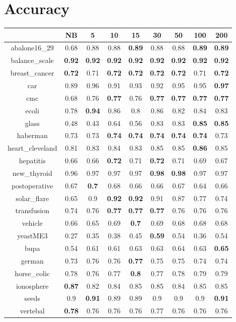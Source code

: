 \documentclass{article}%
\begin{document}
%
\normalsize%
\section*{Accuracy}%
\begin{tabular}{c|cccccccc}%
\hline%
&NB&5&10&15&30&50&100&200\\%
\hline%
abalone16\_29&0.68&0.88&0.88&\textbf{0.89}&0.88&0.88&\textbf{0.89}&\textbf{0.89}\\%
\hline%
balance\_scale&\textbf{0.92}&\textbf{0.92}&\textbf{0.92}&\textbf{0.92}&\textbf{0.92}&\textbf{0.92}&\textbf{0.92}&\textbf{0.92}\\%
\hline%
breast\_cancer&\textbf{0.72}&0.71&\textbf{0.72}&\textbf{0.72}&\textbf{0.72}&\textbf{0.72}&0.71&\textbf{0.72}\\%
\hline%
car&0.89&0.96&0.91&0.93&0.92&0.95&0.95&\textbf{0.97}\\%
\hline%
cmc&0.68&0.76&\textbf{0.77}&0.76&\textbf{0.77}&\textbf{0.77}&\textbf{0.77}&\textbf{0.77}\\%
\hline%
ecoli&0.78&\textbf{0.94}&0.86&0.8&0.86&0.82&0.84&0.83\\%
\hline%
glass&0.48&0.43&0.64&0.56&0.83&0.83&\textbf{0.85}&\textbf{0.85}\\%
\hline%
haberman&0.73&0.73&\textbf{0.74}&\textbf{0.74}&\textbf{0.74}&\textbf{0.74}&\textbf{0.74}&0.73\\%
\hline%
heart\_cleveland&0.81&0.83&0.84&0.83&0.85&0.85&\textbf{0.86}&0.85\\%
\hline%
hepatitis&0.66&0.66&\textbf{0.72}&0.71&\textbf{0.72}&0.71&0.69&0.67\\%
\hline%
new\_thyroid&0.96&0.97&0.97&0.97&\textbf{0.98}&\textbf{0.98}&0.97&0.97\\%
\hline%
postoperative&0.67&\textbf{0.7}&0.68&0.66&0.66&0.67&0.64&0.66\\%
\hline%
solar\_flare&0.65&0.9&\textbf{0.92}&\textbf{0.92}&0.91&0.87&0.77&0.74\\%
\hline%
transfusion&0.74&0.76&\textbf{0.77}&\textbf{0.77}&\textbf{0.77}&0.76&0.76&0.76\\%
\hline%
vehicle&0.66&0.65&0.69&\textbf{0.7}&0.69&0.68&0.68&0.68\\%
\hline%
yeastME3&0.27&0.35&0.38&0.45&\textbf{0.59}&0.54&0.36&0.54\\%
\hline%
bupa&0.54&0.61&0.61&0.63&0.63&0.64&0.63&\textbf{0.65}\\%
\hline%
german&0.73&0.76&0.76&\textbf{0.77}&0.75&0.75&0.74&0.74\\%
\hline%
horse\_colic&0.78&0.76&0.77&\textbf{0.8}&0.77&0.78&0.79&0.79\\%
\hline%
ionosphere&\textbf{0.87}&0.82&0.84&0.85&0.85&0.84&0.85&0.85\\%
\hline%
seeds&0.9&\textbf{0.91}&0.89&0.89&0.9&0.9&0.9&\textbf{0.91}\\%
\hline%
vertebal&\textbf{0.78}&0.76&0.76&0.76&0.77&0.76&0.76&0.76\\%
\hline%
\end{tabular}
\end{document}

